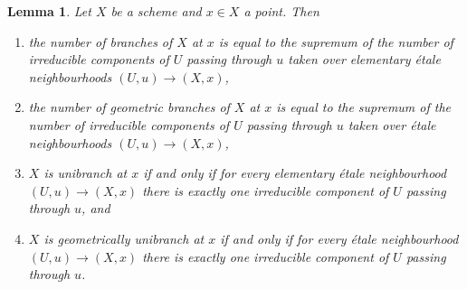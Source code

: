 \documentclass[10pt,a4paper]{amsart}
\theoremstyle{plain}
\newtheorem{lemma}[subsection]{Lemma}
\theoremstyle{definition}
\theoremstyle{remark}
\numberwithin{equation}{subsection}
\begin{document}
\begin{lemma}
\label{lemma-nr-branches}
Let $X$ be a scheme and $x \in X$ a point. Then
\begin{enumerate}
\item the number of branches of $X$ at $x$ is equal to
the supremum of the number of irreducible components of $U$
passing through $u$ taken over elementary \'etale neighbourhoods
$(U, u) \to (X, x)$,
\item the number of geometric branches of $X$ at $x$ is equal to
the supremum of the number of irreducible components of $U$
passing through $u$ taken over \'etale neighbourhoods
$(U, u) \to (X, x)$,
\item $X$ is unibranch at $x$ if and only if for every
elementary \'etale neighbourhood $(U, u) \to (X, x)$ there
is exactly one irreducible component of $U$ passing through $u$, and
\item $X$ is geometrically unibranch at $x$ if and only if for every
\'etale neighbourhood $(U, u) \to (X, x)$ there
is exactly one irreducible component of $U$ passing through $u$.
\end{enumerate}
\end{lemma}
\end{document}
